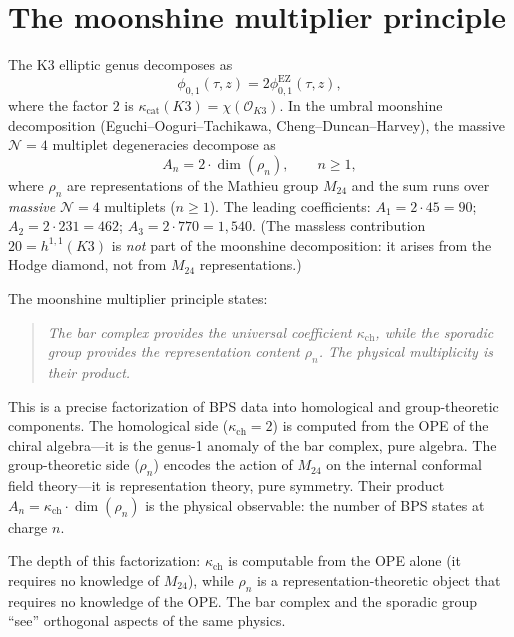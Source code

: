 \documentclass[11pt]{article}
\newcommand{\cN}{\mathcal{N}}
\newcommand{\cO}{\mathcal{O}}
\begin{document}
\section{The moonshine multiplier principle}
\label{sec:motivic-moonshine-multiplier}

The K3 elliptic genus decomposes as
\[
 \phi_{0,1}(\tau, z) = 2\phi_{0,1}^{\mathrm{EZ}}(\tau, z),
\]
where the factor $2$ is $\kappa_{\mathrm{cat}}(K3) = \chi(\cO_{K3})$. In the umbral moonshine decomposition (Eguchi--Ooguri--Tachikawa, Cheng--Duncan--Harvey), the massive $\cN = 4$ multiplet degeneracies decompose as
\[
 A_n = 2 \cdot \dim(\rho_n), \qquad n \geq 1,
\]
where $\rho_n$ are representations of the Mathieu group $M_{24}$ and the sum runs over \emph{massive} $\cN = 4$ multiplets ($n \geq 1$). The leading coefficients: $A_1 = 2 \cdot 45 = 90$; $A_2 = 2 \cdot 231 = 462$; $A_3 = 2 \cdot 770 = 1{,}540$. (The massless contribution $20 = h^{1,1}(K3)$ is \emph{not} part of the moonshine decomposition: it arises from the Hodge diamond, not from $M_{24}$ representations.)

The moonshine multiplier principle states:
\begin{quote}
\emph{The bar complex provides the universal coefficient $\kappa_{\mathrm{ch}}$, while the sporadic group provides the representation content $\rho_n$. The physical multiplicity is their product.}
\end{quote}

This is a precise factorization of BPS data into homological and group-theoretic components. The homological side ($\kappa_{\mathrm{ch}} = 2$) is computed from the OPE of the chiral algebra---it is the genus-1 anomaly of the bar complex, pure algebra. The group-theoretic side ($\rho_n$) encodes the action of $M_{24}$ on the internal conformal field theory---it is representation theory, pure symmetry. Their product $A_n = \kappa_{\mathrm{ch}} \cdot \dim(\rho_n)$ is the physical observable: the number of BPS states at charge $n$.

The depth of this factorization: $\kappa_{\mathrm{ch}}$ is computable from the OPE alone (it requires no knowledge of $M_{24}$), while $\rho_n$ is a representation-theoretic object that requires no knowledge of the OPE. The bar complex and the sporadic group ``see'' orthogonal aspects of the same physics.
\end{document}
